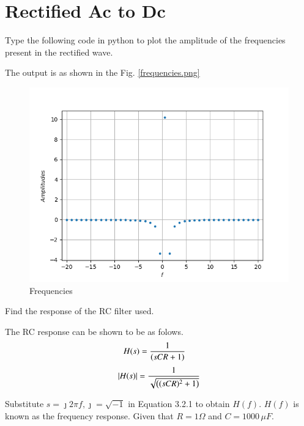 \documentclass[journal,12pt,twocolumn]{IEEEtran}
\begin{document}
\section{Rectified Ac to Dc}
\begin{problem}
Type the following code in python to plot the amplitude of the frequencies present in the rectified wave.
\end{problem}

\solution
The output is as shown in the Fig. \ref{frequencies.png}
\begin{figure}[h]
\centering
	\includegraphics[scale=0.4]{./figs/frequencies.png}
	\caption{Frequencies}  \label{frequencies}
    \end{figure}

\begin{problem}
Find the response of the RC filter used.
\end{problem}
\solution
The RC response can be shown to be as folows.
\begin{align}
H(s) &= \frac{1}{\left(sCR + 1 \right)}
\label{lpf_laplace}
\end{align}
\begin{align}
\left\vert H(s)\right\vert &= \frac{1}{\sqrt{\left((sCR)^2 + 1 \right)}} \\
\label{lpf1laplace}
\end{align}
\begin{problem}
Substitute $s = \jmath 2\pi f, \jmath =  \sqrt{-1}$ in Equation 3.2.1 to obtain $H(f)$.  
$H(f)$ is 
known as the frequency response.  Given that $R = 1 \Omega$ and $C = 1000 \,\mu F$.
\end{problem}
%
\end{document}
